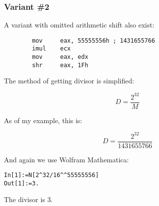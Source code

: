 \subsubsection{Variant \#2}

A variant with omitted arithmetic shift also exist:

\begin{lstlisting}
		mov     eax, 55555556h ; 1431655766
		imul    ecx
		mov     eax, edx
		shr     eax, 1Fh
\end{lstlisting}

The method of getting divisor is simplified:

\[
D=\frac{2^{32}}{M}
\]

As of my example, this is:

\[
D=\frac{2^{32}}{1431655766}
\]


And again we use Wolfram Mathematica:

\begin{lstlisting}[caption=Wolfram Mathematica]
In[1]:=N[2^32/16^^55555556]
Out[1]:=3.
\end{lstlisting}

The divisor is 3.
